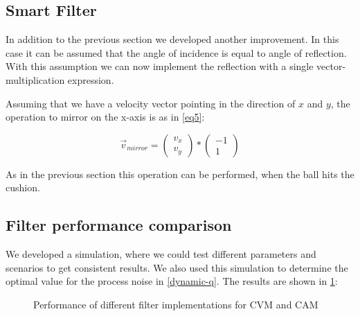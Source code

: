 \documentclass[notitlepage, a4paper, 11pt]{scrartcl}
\begin{document}
\begin{multicols}{2}
\subsection{Smart Filter} \label{smart-filter}

In addition to the previous section we developed another improvement. In this case it can be assumed that the angle of incidence is equal to angle of reflection. 
With this assumption we can now implement the reflection with a single vector-multiplication expression. 

Assuming that we have a velocity vector pointing in the direction of $x$ and $y$, the operation to mirror on the x-axis is as in \cref{eq5}:

\begin{equation} 
    \label{eq5}
    \vec{v}_{mirror} = 
    \left(\!
    \begin{array}{c}
      v_x \\
      v_y
    \end{array}
    \!\right) *
    \left(\!
    \begin{array}{c}
        -1 \\
        1
    \end{array}
    \!\right)
\end{equation}

As in the previous section this operation can be performed, when the ball hits the cushion.


\subsection{Filter performance comparison} \label{perf-comp}

We developed a simulation, where we could test different parameters and scenarios to get consistent results. 
We also used this simulation to determine the optimal value for the process noise in \cref{dynamic-q}. The results are shown in \cref{fig:sim-results}:

\begin{figure}[H]
    \centering
    \caption{Performance of different filter implementations for CVM and CAM}
    \label{fig:sim-results}
\end{figure}


\end{multicols}
\end{document}
